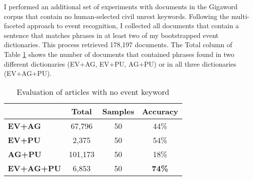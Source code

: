 I performed an additional set of experiments with documents in the
Gigaword corpus that contain no human-selected civil unrest keywords.
Following the multi-faceted approach to event recognition, I collected all documents that 
contain a sentence that matches phrases in at least two of my bootstrapped event dictionaries.
This process retrieved 178,197 documents. 
The Total column of Table \ref{results-table-nokey} shows the number
of documents that contained phrases found in two different dictionaries
(EV+AG, EV+PU, AG+PU) or 
in all three dictionaries (EV+AG+PU).
\begin{table}[ht]
\small
\centering
\begin{tabular}[center]{|lccc|} \hline
{\bf }  & {\bf Total} & {\bf Samples} & {\bf Accuracy}\\ \hline 
{\bf EV+AG}  & 67,796 & 50 & 44\% \\
{\bf EV+PU}  & 2,375 & 50 & 54\% \\
{\bf AG+PU} & 101,173  & 50 & 18\% \\
{\bf EV+AG+PU} & 6,853 & 50 & {\bf 74\%} \\ \hline
\end{tabular}
\caption{Evaluation of articles with no event keyword}
\label{results-table-nokey}
\end{table}

